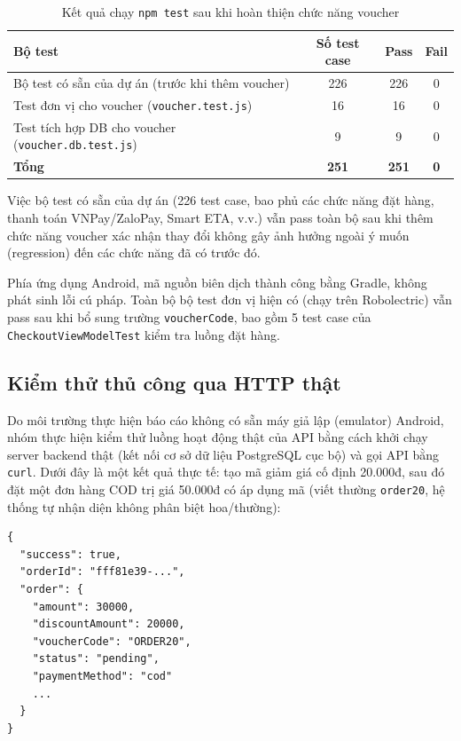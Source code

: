 \documentclass[12pt,a4paper]{article}
\begin{document}
\begin{table}[H]
\centering
\begin{tabular}{@{}lccc@{}}
\toprule
\textbf{Bộ test} & \textbf{Số test case} & \textbf{Pass} & \textbf{Fail} \\
\midrule
Bộ test có sẵn của dự án (trước khi thêm voucher) & 226 & 226 & 0 \\
Test đơn vị cho voucher (\texttt{voucher.test.js}) & 16 & 16 & 0 \\
Test tích hợp DB cho voucher (\texttt{voucher.db.test.js}) & 9 & 9 & 0 \\
\midrule
\textbf{Tổng} & \textbf{251} & \textbf{251} & \textbf{0} \\
\bottomrule
\end{tabular}
\caption{Kết quả chạy \texttt{npm test} sau khi hoàn thiện chức năng voucher}
\end{table}

Việc bộ test có sẵn của dự án (226 test case, bao phủ các chức năng đặt hàng, thanh toán VNPay/ZaloPay, Smart ETA, v.v.) vẫn pass toàn bộ sau khi thêm chức năng voucher xác nhận thay đổi không gây ảnh hưởng ngoài ý muốn (regression) đến các chức năng đã có trước đó.

Phía ứng dụng Android, mã nguồn biên dịch thành công bằng Gradle, không phát sinh lỗi cú pháp. Toàn bộ bộ test đơn vị hiện có (chạy trên Robolectric) vẫn pass sau khi bổ sung trường \texttt{voucherCode}, bao gồm 5 test case của \texttt{CheckoutViewModelTest} kiểm tra luồng đặt hàng.

\subsection{Kiểm thử thủ công qua HTTP thật}

Do môi trường thực hiện báo cáo không có sẵn máy giả lập (emulator) Android, nhóm thực hiện kiểm thử luồng hoạt động thật của API bằng cách khởi chạy server backend thật (kết nối cơ sở dữ liệu PostgreSQL cục bộ) và gọi API bằng \texttt{curl}. Dưới đây là một kết quả thực tế: tạo mã giảm giá cố định 20.000đ, sau đó đặt một đơn hàng COD trị giá 50.000đ có áp dụng mã (viết thường \texttt{order20}, hệ thống tự nhận diện không phân biệt hoa/thường):

\begin{lstlisting}[caption={Kết quả gọi API thật -- đặt hàng có áp dụng voucher}]
{
  "success": true,
  "orderId": "fff81e39-...",
  "order": {
    "amount": 30000,
    "discountAmount": 20000,
    "voucherCode": "ORDER20",
    "status": "pending",
    "paymentMethod": "cod"
    ...
  }
}
\end{lstlisting}
\end{document}
